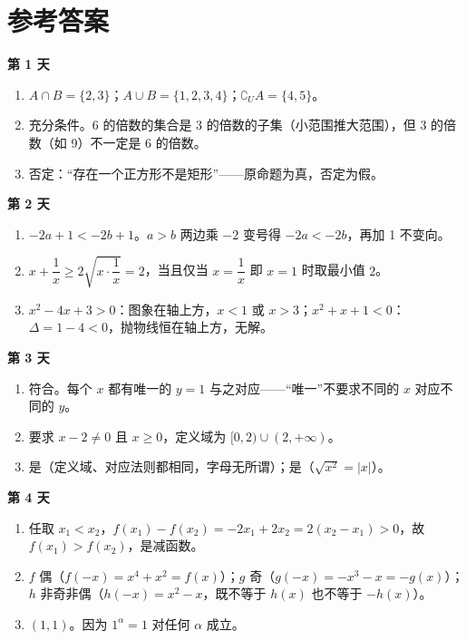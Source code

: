 \documentclass[UTF8,a4paper,11pt]{ctexart}
\begin{document}
\newpage

\section*{参考答案}

\textbf{第 1 天}
\begin{enumerate}
  \item $A \cap B = \{2,3\}$；$A \cup B = \{1,2,3,4\}$；$\complement_U A = \{4,5\}$。
  \item 充分条件。6 的倍数的集合是 3 的倍数的子集（小范围推大范围），但 3 的倍数（如 9）不一定是 6 的倍数。
  \item 否定：“存在一个正方形不是矩形”——原命题为真，否定为假。
\end{enumerate}

\textbf{第 2 天}
\begin{enumerate}
  \item $-2a + 1 < -2b + 1$。$a > b$ 两边乘 $-2$ 变号得 $-2a < -2b$，再加 1 不变向。
  \item $x + \dfrac{1}{x} \geq 2\sqrt{x \cdot \dfrac{1}{x}} = 2$，当且仅当 $x = \dfrac{1}{x}$ 即 $x = 1$ 时取最小值 $2$。
  \item $x^2 - 4x + 3 > 0$：图象在轴上方，$x < 1$ 或 $x > 3$；$x^2 + x + 1 < 0$：$\Delta = 1 - 4 < 0$，抛物线恒在轴上方，无解。
\end{enumerate}

\textbf{第 3 天}
\begin{enumerate}
  \item 符合。每个 $x$ 都有唯一的 $y=1$ 与之对应——“唯一”不要求不同的 $x$ 对应不同的 $y$。
  \item 要求 $x - 2 \neq 0$ 且 $x \geq 0$，定义域为 $[0,2) \cup (2,+\infty)$。
  \item 是（定义域、对应法则都相同，字母无所谓）；是（$\sqrt{x^2} = |x|$）。
\end{enumerate}

\textbf{第 4 天}
\begin{enumerate}
  \item 任取 $x_1 < x_2$，$f(x_1) - f(x_2) = -2x_1 + 2x_2 = 2(x_2 - x_1) > 0$，故 $f(x_1) > f(x_2)$，是减函数。
  \item $f$ 偶（$f(-x) = x^4 + x^2 = f(x)$）；$g$ 奇（$g(-x) = -x^3 - x = -g(x)$）；$h$ 非奇非偶（$h(-x) = x^2 - x$，既不等于 $h(x)$ 也不等于 $-h(x)$）。
  \item $(1,1)$。因为 $1^{\alpha} = 1$ 对任何 $\alpha$ 成立。
\end{enumerate}
\end{document}

